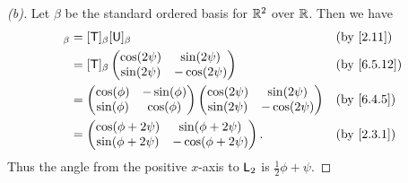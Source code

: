 \begin{proof}[(b)]
  Let \(\beta\) be the standard ordered basis for \(\mathbb{R}^2\) over \(\mathbb{R}\).
  Then we have
  \begin{align*}
    [\T \U]_{\beta} & = [\T]_{\beta} [\U]_{\beta}                   &  & \by{2.11} \\
                    & = [\T]_{\beta} \begin{pmatrix}
                                       \cos(2 \psi) & \sin(2 \psi)  \\
                                       \sin(2 \psi) & -\cos(2 \psi)
                                     \end{pmatrix}               &  & \by{6.5.12}  \\
                    & = \begin{pmatrix}
                          \cos(\phi) & -\sin(\phi) \\
                          \sin(\phi) & \cos(\phi)
                        \end{pmatrix} \begin{pmatrix}
                                        \cos(2 \psi) & \sin(2 \psi)  \\
                                        \sin(2 \psi) & -\cos(2 \psi)
                                      \end{pmatrix}               &  & \by{6.4.5}  \\
                    & = \begin{pmatrix}
                          \cos(\phi + 2 \psi) & \sin(\phi + 2 \psi)  \\
                          \sin(\phi + 2 \psi) & -\cos(\phi + 2 \psi)
                        \end{pmatrix}. &  & \by{2.3.1}
  \end{align*}
  Thus the angle from the positive \(x\)-axis to \(\mathsf{L}_2\) is \(\frac{1}{2} \phi + \psi\).
\end{proof}

